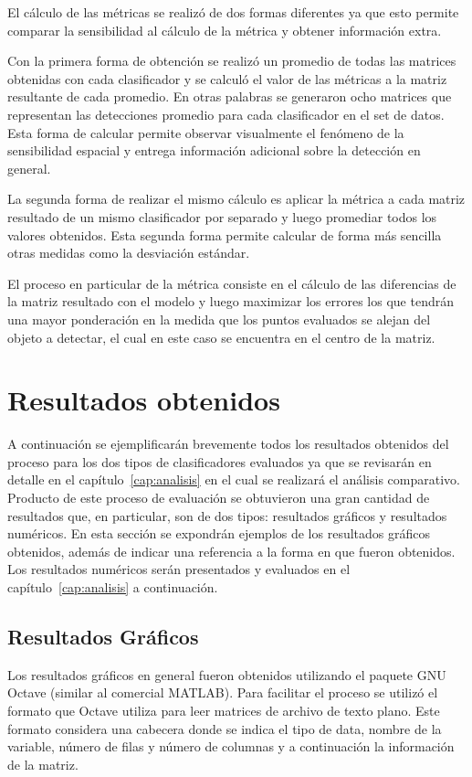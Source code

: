 El cálculo de las métricas se realizó de dos formas diferentes ya que esto permite comparar la sensibilidad al cálculo de la métrica y obtener información extra.

Con la primera forma de obtención se realizó un promedio de todas las matrices obtenidas con cada clasificador y se calculó el valor de las métricas a la matriz resultante de cada promedio. En otras palabras se generaron ocho matrices que representan las detecciones promedio para cada clasificador en el set de datos. Esta forma de calcular permite observar visualmente el fenómeno de la sensibilidad espacial y entrega información adicional sobre la detección en general.

La segunda forma de realizar el mismo cálculo es aplicar la métrica a cada matriz resultado de un mismo clasificador por separado y luego promediar todos los valores obtenidos. Esta segunda forma permite calcular de forma más sencilla otras medidas como la desviación estándar.

El proceso en particular de la métrica consiste en el cálculo de las diferencias de la matriz resultado con el modelo y luego maximizar los errores los que tendrán una mayor ponderación en la medida que los puntos evaluados se alejan del objeto a detectar, el cual en este caso se encuentra en el centro de la matriz.

\section{Resultados obtenidos}
\label{eval:resultados}

A continuación se ejemplificarán brevemente todos los resultados obtenidos del proceso para los dos tipos de clasificadores evaluados ya que se revisarán en detalle en el capítulo~\ref{cap:analisis} en el cual se realizará el análisis comparativo. Producto de este proceso de evaluación se obtuvieron una gran cantidad de resultados que, en particular, son de dos tipos: resultados gráficos y resultados numéricos. En esta sección se expondrán ejemplos de los resultados gráficos obtenidos, además de indicar una referencia a la forma en que fueron obtenidos. Los resultados numéricos serán presentados y evaluados en el capítulo~\ref{cap:analisis} a continuación.

\subsection{Resultados Gráficos}

Los resultados gráficos en general fueron obtenidos utilizando el paquete GNU Octave (similar al comercial MATLAB). Para facilitar el proceso se utilizó el formato que Octave utiliza para leer matrices de archivo de texto plano. Este formato considera una cabecera donde se indica el tipo de data, nombre de la variable, número de filas y número de columnas y a continuación la información de la matriz.

